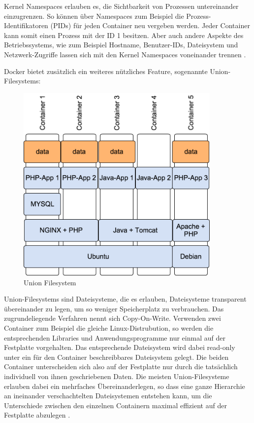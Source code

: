 Kernel Namespaces erlauben es, die Sichtbarkeit von Prozessen untereinander einzugrenzen. So können über Namespaces zum Beispiel die Prozess-Identifikatoren (PIDs) für jeden Container neu vergeben werden. Jeder Container kann somit einen Prozess mit der ID 1 besitzen. Aber auch andere Aspekte des Betriebssystems, wie zum Beispiel Hostname, Benutzer-IDs, Dateisystem und Netzwerk-Zugriffe lassen sich mit den Kernel Namespaces voneinander trennen \citep[Vgl.][S. 3]{Schee14}.

Docker bietet zusätzlich ein weiteres nützliches Feature, sogenannte Union-Filesystems:

\begin{figure}[!ht]
  \begin{center}
    \includegraphics[width=10cm]{bilder/UnionFilesystem.png}
    \caption{Union Filesystem}
    \label{Union Filesystem}
  \end{center}
\end{figure}

Union-Filesystems sind Dateisysteme, die es erlauben, Dateisysteme transparent übereinander zu legen, um so weniger Speicherplatz zu verbrauchen. Das zugrundeliegende Verfahren nennt sich Copy-On-Write. Verwenden zwei Container zum Beispiel die gleiche Linux-Distrubution, so werden die entsprechenden Libraries und Anwendungsprogramme nur einmal auf der Festplatte vorgehalten. Das entsprechende Dateisystem wird dabei read-only unter ein für den Container beschreibbares Dateisystem gelegt. Die beiden Container unterscheiden sich also auf der Festplatte nur durch die tatsächlich individuell von ihnen geschriebenen Daten. Die meisten Union-Filesysteme erlauben dabei ein mehrfaches Übereinanderlegen, so dass eine ganze Hierarchie an ineinander verschachtelten Dateisystemen entstehen kann, um die Unterschiede zwischen den einzelnen Containern maximal effizient auf der Festplatte abzulegen \citep[Vgl.][S. 3]{Schee14}.

